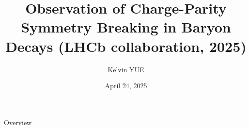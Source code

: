 \documentclass[xcolor=dvipsnames]{beamer}
\title[Observation of Charge-Parity Symmetry Breaking in Baryon Decays]{\textbf{Observation of Charge-Parity Symmetry Breaking in Baryon Decays (LHCb collaboration, 2025)}}
\date{April 24, 2025}
\author[Kelvin YUE]{Kelvin YUE}
\institute[]{Department of Physics, HKUST}
\begin{document}
\frame{\titlepage}

\begin{frame}{Overview}
    \tableofcontents
\end{frame}
\end{document}
